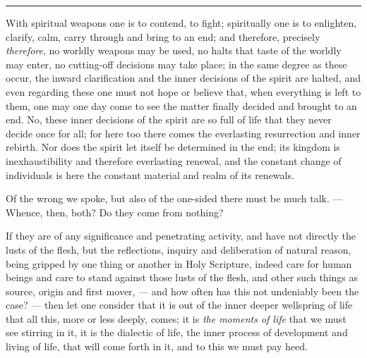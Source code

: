 \documentclass[12pt,a4paper,openany]{book}
\newcommand{\sectionrule}{\par\begin{center}\rule{4em}{0.4pt}\end{center}}
\begin{document}
\sectionrule

With spiritual weapons one is to contend, to fight; spiritually one is to enlighten,
clarify, calm, carry through and bring to an end; and therefore, precisely
\emph{therefore}, no worldly weapons may be used, no halts that taste of the worldly
may enter, no cutting-off decisions may take place; in the same degree as these
occur, the inward clarification and the inner decisions of the spirit are halted, and
even regarding these one must not hope or believe that, when everything is left to
them, one may one day come to see the matter finally decided and brought to an end.
No, these inner decisions of the spirit are so full of life that they never decide
once for all; for here too there comes the everlasting resurrection and inner
rebirth. Nor does the spirit let itself be determined in the end; its kingdom is
inexhaustibility and therefore everlasting renewal, and the constant change of
individuals is here the constant material and realm of its renewals.

Of the wrong we spoke, but also of the one-sided there must be much talk. --- Whence,
then, both? Do they come from nothing?

If they are of any significance and penetrating activity, and have not directly the
lusts of the flesh, but the reflections, inquiry and deliberation of natural reason,
being gripped by one thing or another in Holy Scripture, indeed care for human beings
and care to stand against those lusts of the flesh, and other such things as source,
origin and first mover, --- and how often has this not undeniably been the case? ---
then let one consider that it is out of the inner deeper wellspring of life that all
this, more or less deeply, comes; it is \emph{the moments of life} that we must see
stirring in it, it is the dialectic of life, the inner process of development and
living of life, that will come forth in it, and to this we must pay heed.
\end{document}
